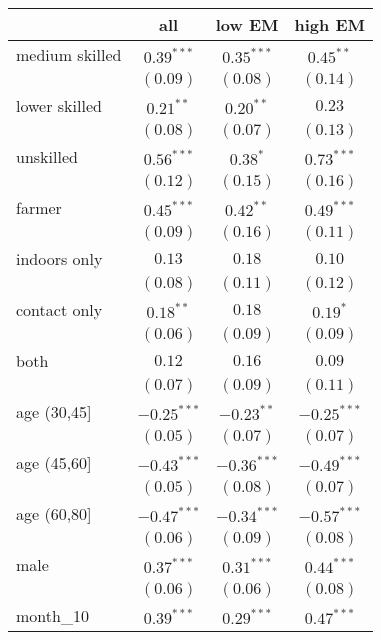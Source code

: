 
\begin{table}
\begin{center}
\begin{tabular}{l c c c}
\hline
 & all & low EM & high EM \\
\hline
medium skilled & $0.39^{***}$  & $0.35^{***}$  & $0.45^{**}$   \\
               & $(0.09)$      & $(0.08)$      & $(0.14)$      \\
lower skilled  & $0.21^{**}$   & $0.20^{**}$   & $0.23$        \\
               & $(0.08)$      & $(0.07)$      & $(0.13)$      \\
unskilled      & $0.56^{***}$  & $0.38^{*}$    & $0.73^{***}$  \\
               & $(0.12)$      & $(0.15)$      & $(0.16)$      \\
farmer         & $0.45^{***}$  & $0.42^{**}$   & $0.49^{***}$  \\
               & $(0.09)$      & $(0.16)$      & $(0.11)$      \\
indoors only   & $0.13$        & $0.18$        & $0.10$        \\
               & $(0.08)$      & $(0.11)$      & $(0.12)$      \\
contact only   & $0.18^{**}$   & $0.18$        & $0.19^{*}$    \\
               & $(0.06)$      & $(0.09)$      & $(0.09)$      \\
both           & $0.12$        & $0.16$        & $0.09$        \\
               & $(0.07)$      & $(0.09)$      & $(0.11)$      \\
age (30,45]    & $-0.25^{***}$ & $-0.23^{**}$  & $-0.25^{***}$ \\
               & $(0.05)$      & $(0.07)$      & $(0.07)$      \\
age (45,60]    & $-0.43^{***}$ & $-0.36^{***}$ & $-0.49^{***}$ \\
               & $(0.05)$      & $(0.08)$      & $(0.07)$      \\
age (60,80]    & $-0.47^{***}$ & $-0.34^{***}$ & $-0.57^{***}$ \\
               & $(0.06)$      & $(0.09)$      & $(0.08)$      \\
male           & $0.37^{***}$  & $0.31^{***}$  & $0.44^{***}$  \\
               & $(0.06)$      & $(0.06)$      & $(0.08)$      \\
month\_10      & $0.39^{***}$  & $0.29^{***}$  & $0.47^{***}$  \\

\end{tabular}
\end{center}
\end{table}
